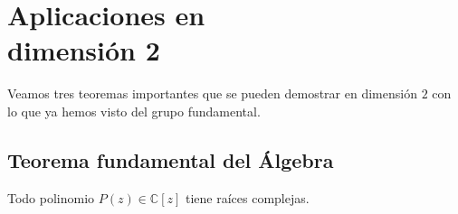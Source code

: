 \chapter{Aplicaciones en\texorpdfstring{\\}{} dimensión 2}%
\label{cha:aplicaciones_en_dimension_2_}
Veamos tres teoremas importantes que se pueden demostrar en dimensión $2$ con lo que ya hemos visto del grupo fundamental.

\section{Teorema fundamental del Álgebra}%
\label{sec:teorema_fundamental_del_algebra}
\begin{theo}
Todo polinomio $P\left( z \right) \in \mathbb{C}\left[ z \right]$ tiene raíces complejas. 
\end{theo}
